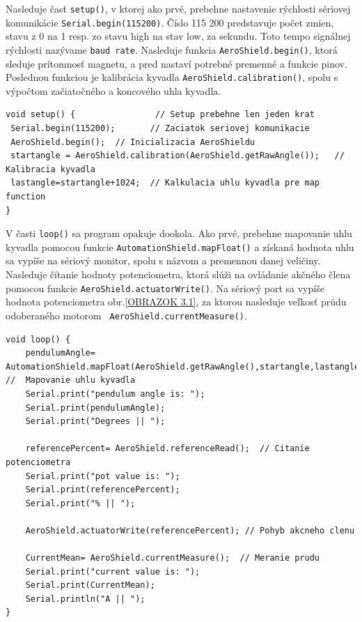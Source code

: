 Nasleduje časť \verb|setup()|, v ktorej ako prvé, prebehne nastavenie rýchlosti sériovej komunikácie \verb|Serial.begin(115200)|. Číslo 115 200 predstavuje počet zmien, stavu z 0 na 1 resp. zo stavu high na stav low, za sekundu. Toto tempo signálnej rýchlosti nazývame \verb|baud rate|. Nasleduje funkcia \verb|AeroShield.begin()|, ktorá sleduje prítomnosť magnetu, a pred nastaví potrebné premenné a funkcie pinov. Poslednou funkciou je kalibrácia kyvadla \verb|AeroShield.calibration()|, spolu s výpočtom začiatočného a koncového uhla kyvadla. 

\begin{lstlisting}[caption={AeroShield open loop setup().},captionpos=b]
void setup() {                // Setup prebehne len jeden krat 
 Serial.begin(115200);       // Zaciatok seriovej komunikacie 
 AeroShield.begin();  // Inicializacia AeroShieldu 
 startangle = AeroShield.calibration(AeroShield.getRawAngle());   // Kalibracia kyvadla
 lastangle=startangle+1024;  // Kalkulacia uhlu kyvadla pre map function
}
\end{lstlisting}

V časti \verb|loop()| sa program opakuje dookola. Ako prvé, prebehne mapovanie uhlu kyvadla pomocou funkcie \verb|AutomationShield.mapFloat()| a získaná hodnota uhlu sa vypíše na sériový monitor, spolu s názvom a premennou danej veličiny. Nasleduje čítanie hodnoty potenciometra, ktorá slúži na ovládanie akčného člena pomocou funkcie \verb|AeroShield.actuatorWrite()|. Na sériový port sa vypíše hodnota potenciometra obr.\ref{OBRAZOK 3.1}, za ktorou nasleduje veľkosť prúdu odoberaného motorom \verb| AeroShield.currentMeasure()|. 

\begin{lstlisting}[caption={AeroShield open loop loop().},captionpos=b]
void loop() {
	pendulumAngle= AutomationShield.mapFloat(AeroShield.getRawAngle(),startangle,lastangle,0.00,90.00);    //  Mapovanie uhlu kyvadla 
	Serial.print("pendulum angle is: ");
	Serial.print(pendulumAngle);    
	Serial.print("Degrees || ");
	
	referencePercent= AeroShield.referenceRead();  // Citanie potenciometra
	Serial.print("pot value is: ");
	Serial.print(referencePercent);  
	Serial.print("% || ");
	
	AeroShield.actuatorWrite(referencePercent); // Pohyb akcneho clenu
	
	CurrentMean= AeroShield.currentMeasure();  // Meranie prudu
	Serial.print("current value is: ");
	Serial.print(CurrentMean);   
	Serial.println("A || ");
}
\end{lstlisting}

